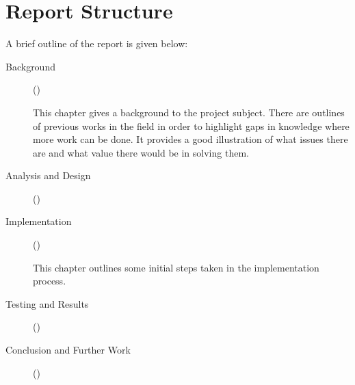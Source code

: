\section{Report Structure}

A brief outline of the report is given below:

\begin{description}
      \item[Background] ()

            This chapter gives a background to the project subject. There are outlines of previous works in the field in order to highlight gaps in knowledge where more work can be done. It provides a good illustration of what issues there are and what value there would be in solving them.




      \item[Analysis and Design] ()

      \item[Implementation] ()

            This chapter outlines some initial steps taken in the implementation process.

      \item[Testing and Results] ()
      
      \item[Conclusion and Further Work] ()
\end{description}